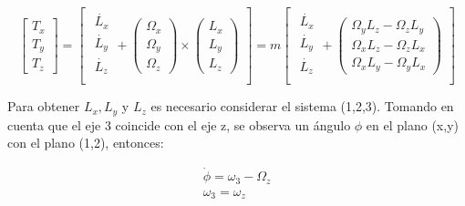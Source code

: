 		\begin{equation}
		\begin{bmatrix}
  		T_{x}\\
  		T_{y}\\
  		T_{z}
  		\end{bmatrix} =
  		\begin{bmatrix}
  		\begin{matrix}
  		\dot{L_{x}}\\
  		\dot{L_{y}}\\
  		\dot{L_{z}}\\
  		\end{matrix}
		+
        \begin{pmatrix}
        \Omega_{x}\\
        \Omega_{y}\\
        \Omega_{z}
		\end{pmatrix}
    	\times
        \begin{pmatrix}
        L_{x}\\
        L_{y}\\
        L_{z}
		\end{pmatrix}
  		\end{bmatrix}
  		=
  		m \begin{bmatrix}
  		\begin{matrix}
  		\dot{L_{x}}\\
  		\dot{L_{y}}\\
  		\dot{L_{z}}\\
  		\end{matrix}
		+
	    \begin{pmatrix}
        \Omega_{y}L_{z}-\Omega_{z}L_{y}\\
        \Omega_{x}L_{z}-\Omega_{z}L_{x}\\
        \Omega_{x}L_{y}-\Omega_{y}L_{x}
		\end{pmatrix}
  		\end{bmatrix}
		\label{ec18}
		\end{equation} %

	Para obtener $L_{x}, L_{y}$ y $L_{z}$ es necesario considerar el sistema (1,2,3). Tomando en cuenta que el eje 3 coincide con el eje z, se observa un ángulo $\phi$ en el plano (x,y) con el plano (1,2), entonces:

    	\begin{subequations}
    	\begin{align}
    	\dot{\phi} = \omega_{3}-\Omega_{z}\\
    	\omega_{3} = \omega_{z}
		\end{align}
		\label{ec19}
		\end{subequations} %

